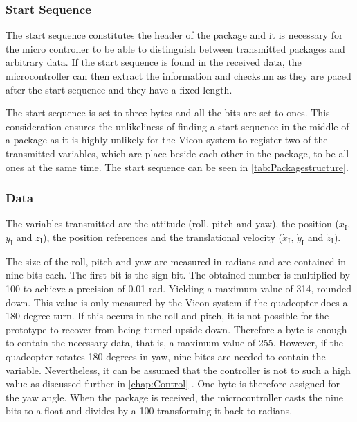 \subsubsection{Start Sequence}
The start sequence constitutes the header of the package and it is necessary for the micro controller to be able to distinguish between transmitted packages and arbitrary data. %
If the start sequence is found in the received data, the microcontroller can then extract the information and checksum as they are paced after the start sequence and they have a fixed length. 

The start sequence is set to three bytes and all the bits are set to ones. This consideration ensures the unlikeliness of finding a start sequence in the middle of a package as it is highly unlikely for the Vicon system to register two of the transmitted variables, which are place beside each other in the package, to be all ones at the same time. The start sequence can be seen in \autoref{tab:Packagestructure}.

\subsubsection{Data}
The variables transmitted are the attitude (roll, pitch and yaw), the position ($x_{\mathrm{I}}$, $y_{\mathrm{I}}$ and $z_{\mathrm{I}}$), the position references and the translational velocity ($\dot{x}_{\mathrm{I}}$, $\dot{y}_{\mathrm{I}}$ and $\dot{z}_{\mathrm{I}}$).

The size of the roll, pitch and yaw are measured in radians and are contained in nine bits each. The first bit is the sign bit. The obtained number is multiplied by 100 to achieve a precision of 0.01 rad. Yielding a maximum value of 314, rounded down. This value is only measured by the Vicon system if the quadcopter does a 180 degree turn. If this occurs in the roll and pitch, it is not possible for the prototype to recover from being turned upside down. Therefore a byte is enough to contain the necessary data, that is, a maximum value of 255. However, if the quadcopter rotates 180 degrees in yaw, nine bites are needed to contain the variable. Nevertheless, it can be assumed that the controller is not to such a high value as discussed further in \autoref{chap:Control} . One byte is therefore assigned for the yaw angle. When the package is received, the microcontroller casts the nine bits to a float and divides by a 100 transforming it back to radians.

